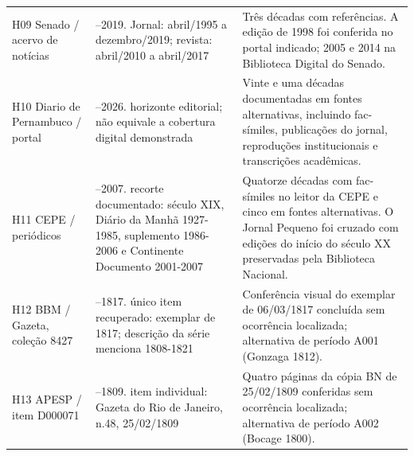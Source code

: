 \begin{longtable}{>{\raggedright\arraybackslash}p{}>{\raggedright\arraybackslash}p{}>{\raggedright\arraybackslash}p{}}
H09 Senado / acervo de notícias & 1995--2019. Jornal: abril/1995 a dezembro/2019; revista: abril/2010 a abril/2017 & Três décadas com referências. A edição de 1998 foi conferida no portal indicado; 2005 e 2014 na Biblioteca Digital do Senado. \cite{r3archiveH09} \\
H10 Diario de Pernambuco / portal & 1825--2026. horizonte editorial; não equivale a cobertura digital demonstrada & Vinte e uma décadas documentadas em fontes alternativas, incluindo fac-símiles, publicações do jornal, reproduções institucionais e transcrições acadêmicas. \cite{r3archiveH10} \\
H11 CEPE / periódicos & 1821--2007. recorte documentado: século XIX, Diário da Manhã 1927-1985, suplemento 1986-2006 e Continente Documento 2001-2007 & Quatorze décadas com fac-símiles no leitor da CEPE e cinco em fontes alternativas. O Jornal Pequeno foi cruzado com edições do início do século XX preservadas pela Biblioteca Nacional. \cite{r3archiveH11} \\
H12 BBM / Gazeta, coleção 8427 & 1817--1817. único item recuperado: exemplar de 1817; descrição da série menciona 1808-1821 & Conferência visual do exemplar de 06/03/1817 concluída sem ocorrência localizada; alternativa de período A001 (Gonzaga 1812). \cite{r3archiveH12} \\
H13 APESP / item D000071 & 1809--1809. item individual: Gazeta do Rio de Janeiro, n.48, 25/02/1809 & Quatro páginas da cópia BN de 25/02/1809 conferidas sem ocorrência localizada; alternativa de período A002 (Bocage 1800). \cite{r3archiveH13} \\
\bottomrule\end{longtable}\normalsize
